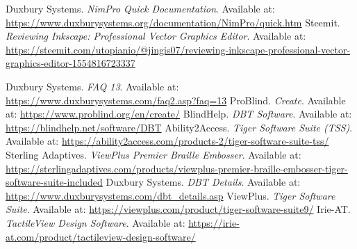 \begin{thebibliography}{99}
 Duxbury Systems. \textit{NimPro Quick Documentation}. Available at: \url{https://www.duxburysystems.org/documentation/NimPro/quick.htm}
 Steemit. \textit{Reviewing Inkscape: Professional Vector Graphics Editor}. Available at: \url{https://steemit.com/utopianio/@jingis07/reviewing-inkscape-professional-vector-graphics-editor-1554816723337}

 Duxbury Systems. \textit{FAQ 13}. Available at: \url{https://www.duxburysystems.com/faq2.asp?faq=13}
 ProBlind. \textit{Create}. Available at: \url{https://www.problind.org/en/create/}
 BlindHelp. \textit{DBT Software}. Available at: \url{https://blindhelp.net/software/DBT}
 Ability2Access. \textit{Tiger Software Suite (TSS)}. Available at: \url{https://ability2access.com/products-2/tiger-software-suite-tss/}
 Sterling Adaptives. \textit{ViewPlus Premier Braille Embosser}. Available at: \url{https://sterlingadaptives.com/products/viewplus-premier-braille-embosser-tiger-software-suite-included}
 Duxbury Systems. \textit{DBT Details}. Available at: \url{https://www.duxburysystems.com/dbt_details.asp}
 ViewPlus. \textit{Tiger Software Suite}. Available at: \url{https://viewplus.com/product/tiger-software-suite9/}
 Irie-AT. \textit{TactileView Design Software}. Available at: \url{https://irie-at.com/product/tactileview-design-software/}

\end{thebibliography}
